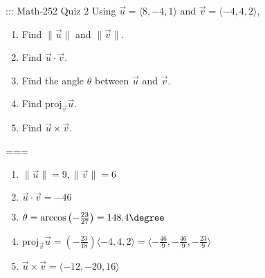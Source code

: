 ::: Math-252 Quiz 2
Using \(\vec u=\langle 8,-4,1\rangle\) and \(\vec v=\langle -4,4,2\rangle\),
\begin{enumerate}[label=\alph*.]
  \item Find \(\|\vec u\|\) and \(\|\vec v\|\).
  \item Find \(\vec u\cdot\vec v\).
  \item Find the angle \(\theta\) between \(\vec u\) and \(\vec v\).
  \item Find \(\text{proj}_{\vec v}\vec u\).
  \item Find \(\vec u\times\vec v\).
\end{enumerate}
===
\begin{enumerate}[label=\alph*.]
  \item \(\|\vec u\|=9,\|\vec v\|=6\)
  \item \(\vec u\cdot\vec v=-46\)
  \item \(\theta=\arccos\left(-\frac{23}{27}\right)=148.4\degree\)
  \item \(\text{proj}_{\vec v}\vec u=\left(-\frac{23}{18}\right)\langle-4,4,2\rangle=\langle-\frac{46}{9},-\frac{46}{9},-\frac{23}{9}\rangle\)
  \item \(\vec u\times\vec v=\langle -12,-20,16\rangle\)
\end{enumerate}
